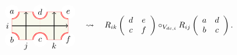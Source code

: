 \begin{equation}
    \begin{tikzpicture}[scale=0.6, baseline=(x.base)]  \node (x) at (0,0) {\vphantom{x}};

        \draw[color=red!50, fill=olive!5] (-1,-1) rectangle (3,1);
        \draw[color=red!50, dotted] (1,-1) -- (1,1);

        \fill[color=white] (-1,1) circle (0.5);  \node (a) at (-1,1) {$a$};
        \draw[draw=red, double]  (-1,0.5) arc (-90:0:0.5);
        \fill[color=white] (-1,-1) circle (0.5);  \node (b) at (-1,-1) {$b$};
        \draw[draw=red, double]  (-1,-0.5) arc (90:0:0.5);
        \fill[color=white] (1,-1) circle (0.5);  \node (c) at (1,-1) {$c$};
        \draw[draw=red, double]  (1.5,-1) arc (0:180:0.5);
        \fill[color=white] (1,1) circle (0.5);  \node (d) at (1,1) {$d$};
        \draw[draw=red, double]  (1.5,1) arc (0:-180:0.5);
        \fill[color=white] (3,-1) circle (0.5);  \node (f) at (3,-1) {$f$};
        \draw[draw=red, double]  (3,-0.5) arc (90:180:0.5);
        \fill[color=white] (3,1) circle (0.5);  \node (e) at (3,1) {$e$};
        \draw[draw=red, double]  (3,0.5) arc (-90:-180:0.5);

        \draw[thick, ->] (-1,0) node[left] {$i$} -- (3,0);
        \draw[thick, ->] (0,-1) node[below] {$j$} -- (0,1);
        \draw[thick, ->] (2,-1) node[below] {$k$} -- (2,1);

    \end{tikzpicture}
\quad \rightsquigarrow \quad
R_{ik}\left(%
  \begin{array}{cc}
        d & e\\
        c & f
  \end{array}%
\right)
  \circ_{V_{dc,i}}
R_{ij}\left(%
  \begin{array}{cc}
        a & d\\
        b & c
  \end{array}%
\right).
\end{equation}


